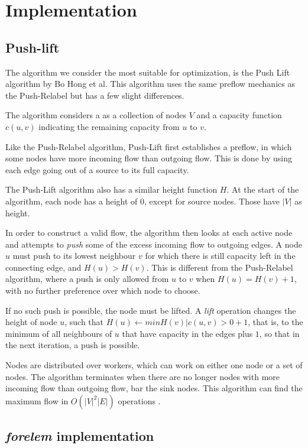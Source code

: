 \chapter{Implementation}

\section{Push-lift}

The algorithm we consider the most suitable for optimization, is the Push Lift algorithm by Bo Hong et al. This algorithm uses the same preflow mechanics as the Push-Relabel \cite{ANewApproachToTheMaxFlowProblem} but has a few slight differences.

The algorithm considers a as a collection of nodes $V$ and a capacity function $c(u, v)$ indicating the remaining capacity from $u$ to $v$.

Like the Push-Relabel algorithm, Push-Lift first establishes a preflow, in which some nodes have more incoming flow than outgoing flow. This is done by using each edge going out of a source to its full capacity.

The Push-Lift algorithm also has a similar height function $H$. At the start of the algorithm, each node has a height of 0, except for source nodes. Those have $|V|$ as height.

In order to construct a valid flow, the algorithm then looks at each active node  and attempts to \emph{push} some of the excess incoming flow to outgoing edges. A node $u$ must push to its lowest neighbour $v$ for which there is still capacity left in the connecting edge, and $H(u) > H(v)$. This is different from the Push-Relabel algorithm, where a push is only allowed from $u$ to $v$ when $H(u) = H(v) + 1$, with no further preference over which node to choose.

If no such push is possible, the node must be lifted. A \emph{lift} operation changes the height of node $u$, such that $H(u) \gets min{H(v) | c(u, v) > 0} + 1$, that is, to the minimum of all neighbours of $u$ that have capacity in the edges plus $1$, so that in the next iteration, a push is possible.

Nodes are distributed over workers, which can work on either one node or a set of nodes. The algorithm terminates when there are no longer nodes with more incoming flow than outgoing flow, bar the sink nodes. This algorithm can find the maximum flow in $O(|V|^2|E|)$ operations \cite{LockFreeMultithreadedMaxFlow}.

\section{\textit{forelem} implementation}

